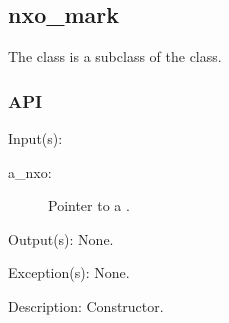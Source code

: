 %
%
%
%
%              

\subsection{nxo\_mark}
\label{nxo_mark}

The  class is a subclass of the  class.

\subsubsection{API}
\begin{capi}
\label{nxo_mark_new}
	\begin{capilist}
	\item[Input(s): ]
		\begin{description}\item[]
		\item[a\_nxo: ]
			Pointer to a .
		\end{description}
	\item[Output(s): ] None.
	\item[Exception(s): ] None.
	\item[Description: ]
		Constructor.
	\end{capilist}
\end{capi}
